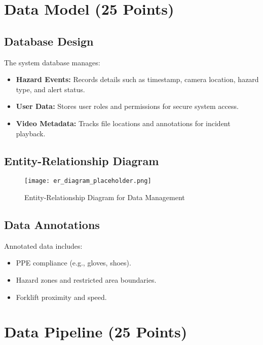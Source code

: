 \documentclass[12pt]{article}
\begin{document}
\newpage
\section{Data Model (25 Points)}
\subsection{Database Design}
The system database manages:
\begin{itemize}
    \item \textbf{Hazard Events:} Records details such as timestamp, camera location, hazard type, and alert status.
    \item \textbf{User Data:} Stores user roles and permissions for secure system access.
    \item \textbf{Video Metadata:} Tracks file locations and annotations for incident playback.
\end{itemize}

\subsection{Entity-Relationship Diagram}
\begin{figure}[h]
    \centering
    \texttt{[image: er\_diagram\_placeholder.png]}
    \caption{Entity-Relationship Diagram for Data Management}
    \label{fig:er_diagram}
\end{figure}

\subsection{Data Annotations}
Annotated data includes:
\begin{itemize}
    \item PPE compliance (e.g., gloves, shoes).
    \item Hazard zones and restricted area boundaries.
    \item Forklift proximity and speed.
\end{itemize}

\section{Data Pipeline (25 Points)}
\end{document}
